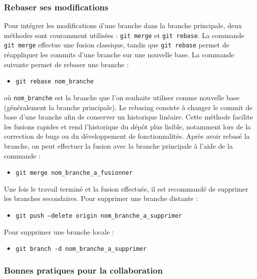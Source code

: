 \documentclass{article}
\begin{document}
\subsubsection{Rebaser ses modifications}
Pour intégrer les modifications d’une branche dans la branche principale, deux méthodes sont couramment utilisées : \texttt{git merge} et \texttt{git rebase}.  
La commande \texttt{git merge} effectue une fusion classique, tandis que \texttt{git rebase} permet de réappliquer les commits d’une branche sur une nouvelle base.
La commande suivante permet de rebaser une branche :
\begin{itemize}
    \item \texttt{git rebase nom\_branche}
\end{itemize}
où \texttt{nom\_branche} est la branche que l’on souhaite utiliser comme nouvelle base (généralement la branche principale).
Le rebasing consiste à changer le commit de base d’une branche afin de conserver un historique linéaire. Cette méthode facilite les fusions rapides et rend l’historique du dépôt plus lisible, notamment lors de la correction de bugs ou du développement de fonctionnalités.
Après avoir rebasé la branche, on peut effectuer la fusion avec la branche principale à l’aide de la commande :
\begin{itemize}
    \item \texttt{git merge nom\_branche\_a\_fusionner}
\end{itemize}
Une fois le travail terminé et la fusion effectuée, il est recommandé de supprimer les branches secondaires.
Pour supprimer une branche distante :
\begin{itemize}
    \item \texttt{git push --delete origin nom\_branche\_a\_supprimer}
\end{itemize}
Pour supprimer une branche locale :
\begin{itemize}
    \item \texttt{git branch -d nom\_branche\_a\_supprimer}
\end{itemize}


\subsubsection{Bonnes pratiques pour la collaboration}
\end{document}
